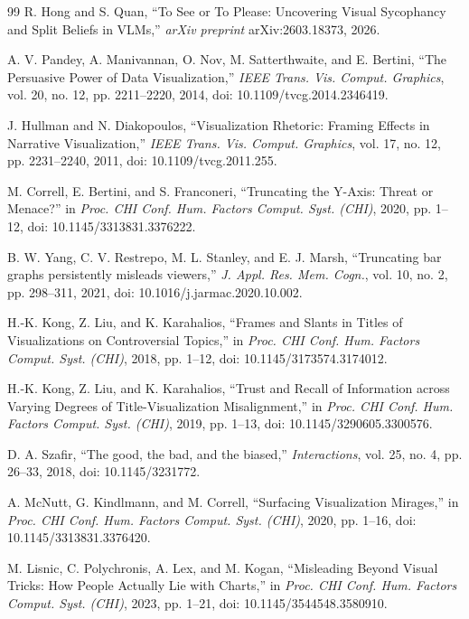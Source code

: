 \documentclass[conference]{IEEEtran}
\begin{document}
\begin{thebibliography}{99}
R. Hong and S. Quan, ``To See or To Please: Uncovering Visual Sycophancy and Split Beliefs in VLMs,'' \emph{arXiv preprint} arXiv:2603.18373, 2026.

A. V. Pandey, A. Manivannan, O. Nov, M. Satterthwaite, and E. Bertini, ``The Persuasive Power of Data Visualization,'' \emph{IEEE Trans. Vis. Comput. Graphics}, vol. 20, no. 12, pp. 2211--2220, 2014, doi: 10.1109/tvcg.2014.2346419.

J. Hullman and N. Diakopoulos, ``Visualization Rhetoric: Framing Effects in Narrative Visualization,'' \emph{IEEE Trans. Vis. Comput. Graphics}, vol. 17, no. 12, pp. 2231--2240, 2011, doi: 10.1109/tvcg.2011.255.

M. Correll, E. Bertini, and S. Franconeri, ``Truncating the Y-Axis: Threat or Menace?'' in \emph{Proc. CHI Conf. Hum. Factors Comput. Syst. (CHI)}, 2020, pp. 1--12, doi: 10.1145/3313831.3376222.

B. W. Yang, C. V. Restrepo, M. L. Stanley, and E. J. Marsh, ``Truncating bar graphs persistently misleads viewers,'' \emph{J. Appl. Res. Mem. Cogn.}, vol. 10, no. 2, pp. 298--311, 2021, doi: 10.1016/j.jarmac.2020.10.002.

H.-K. Kong, Z. Liu, and K. Karahalios, ``Frames and Slants in Titles of Visualizations on Controversial Topics,'' in \emph{Proc. CHI Conf. Hum. Factors Comput. Syst. (CHI)}, 2018, pp. 1--12, doi: 10.1145/3173574.3174012.

H.-K. Kong, Z. Liu, and K. Karahalios, ``Trust and Recall of Information across Varying Degrees of Title-Visualization Misalignment,'' in \emph{Proc. CHI Conf. Hum. Factors Comput. Syst. (CHI)}, 2019, pp. 1--13, doi: 10.1145/3290605.3300576.

D. A. Szafir, ``The good, the bad, and the biased,'' \emph{Interactions}, vol. 25, no. 4, pp. 26--33, 2018, doi: 10.1145/3231772.

A. McNutt, G. Kindlmann, and M. Correll, ``Surfacing Visualization Mirages,'' in \emph{Proc. CHI Conf. Hum. Factors Comput. Syst. (CHI)}, 2020, pp. 1--16, doi: 10.1145/3313831.3376420.

M. Lisnic, C. Polychronis, A. Lex, and M. Kogan, ``Misleading Beyond Visual Tricks: How People Actually Lie with Charts,'' in \emph{Proc. CHI Conf. Hum. Factors Comput. Syst. (CHI)}, 2023, pp. 1--21, doi: 10.1145/3544548.3580910.


\end{thebibliography}
\end{document}
